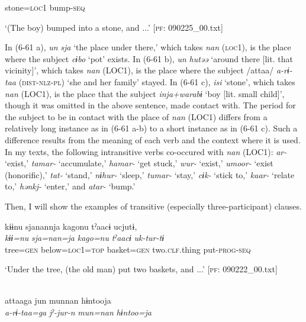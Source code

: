       stone=\textsc{loc}1  bump-\textsc{seq}

\glt ‘(The boy) bumped into a stone, and ...’ [\textsc{pf}: 090225\_00.txt]
\z

In (6-61 a), \textit{un} \textit{sja} ‘the place under there,’ which takes \textit{nan} (\textsc{loc}1), is the place where the subject \textit{cɨbo} ‘pot’ exists. In (6-61 b), \textit{un} \textit{hutəə} ‘around there [lit. that vicinity]’, which takes \textit{nan} (LOC1), is the place where the subject /attaa/ \textit{a-rɨ-taa} (\textsc{dist}-\textsc{nlz}-\textsc{pl}) ‘she and her family’ stayed. In (6-61 c), \textit{isi} ‘stone’, which takes \textit{nan} (LOC1), is the place that the subject \textit{inja+warabɨ} ‘boy [lit. small child]’, though it was omitted in the above sentence, made contact with. The period for the subject to be in contact with the place of \textit{nan} (LOC1) differs from a relatively long instance as in (6-61 a-b) to a short instance as in (6-61 c). Such a difference results from the meaning of each verb and the context where it is used. In my texts, the following intransitive verbs co-occured with \textit{nan} (LOC1): \textit{ar-} ‘exist,’ \textit{tamar-} ‘accumulate,’ \textit{hamar-} ‘get stuck,’ \textit{wur-} ‘exist,’ \textit{umoor-} ‘exist (honorific),’ \textit{tat-} ‘stand,’ \textit{nɨhur-} ‘sleep,’ \textit{tumar-} ‘stay,’ \textit{cɨk-} ‘stick to,’ \textit{kaar-} ‘relate to,’ \textit{hənkj-} ‘enter,’ and \textit{atar-} ‘bump.’

Then, I will show the examples of transitive (especially three-participant) clauses.

\ea\label{ex:6-62}
\ea {\TM}  kɨɨnu  sjanannja  kagonu  tˀaacɨ  ucjutɨ,\\
\gll \textit{kɨɨ=nu}  \textit{sja=nan=ja}  \textit{kago=nu}  \textit{tˀaacɨ}  \textit{uk-tur-tɨ}\\

      tree=\textsc{gen}  below=\textsc{loc}1=\textsc{top}  basket=\textsc{gen}  two.\textsc{clf}.thing  put-\textsc{prog}-\textsc{seq}

\glt ‘Under the tree, (the old man) put two baskets, and ...’ [\textsc{pf}: 090222\_00.txt]
\z

 \ex{}\\
{\TM}
\gll  attaaga  jun  munnan  hɨntooja\\

      \textit{a-rɨ-taa=ga}  \textit{jˀ-jur-n}  \textit{mun=nan}  \textit{hɨntoo=ja}

